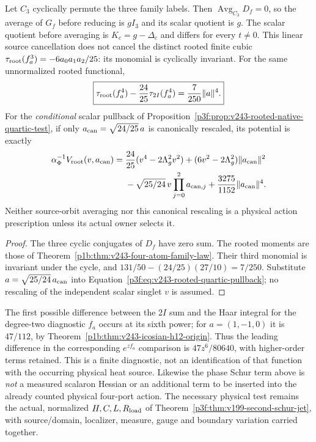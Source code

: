 \documentclass[11pt,a4paper]{article}
\begin{document}
\begin{corollary}
\label{p3g:cor:v244-cyclic-quotient-order}
Let \(C_3\) cyclically permute the three family labels.  Then
\(\operatorname{Avg}_{C_3}D_f=0\), so the average of \(G_f\)
before reducing is \(gI_3\) and its scalar quotient is \(g\).
The scalar quotient before averaging is \(K_c=g-\Delta_c\)
and differs for every \(t\ne0\).  This linear source cancellation
does not cancel the distinct rooted finite cubic
\(\tau_{\rm root}(f_a^3)=-6a_0a_1a_2/25\): its monomial is
cyclically invariant.  For the same unnormalized rooted functional,
\[
 \boxed{\tau_{\rm root}(f_a^4)
 -\frac{24}{25}\tau_{2I}(f_a^4)
 =\frac7{250}\|a\|^4.}
\]
For the \emph{conditional} scalar pullback of
Proposition~\ref{p3f:prop:v243-rooted-native-quartic-test}, if only
\(a_{\rm can}=\sqrt{24/25}\,a\) is canonically rescaled, its
potential is exactly
\[
\begin{aligned}
\alpha_\Phi^{-1}V_{\rm root}(v,a_{\rm can})={}&
\frac{24}{25}(v^4-2\Lambda_g^2v^2)
 +(6v^2-2\Lambda_g^2)\|a_{\rm can}\|^2\\
&-\sqrt{25/24}\,v\prod_{j=0}^2a_{{\rm can},j}
 +\frac{3275}{1152}\|a_{\rm can}\|^4.
\end{aligned}
\]
Neither source-orbit averaging nor this canonical rescaling is a
physical action prescription unless its actual owner selects it.
\end{corollary}
\begin{proof}
The three cyclic conjugates of \(D_f\) have zero sum.
The rooted moments are those of
Theorem~\ref{p1b:thm:v243-four-atom-family-law}.  Their third
monomial is invariant under the cycle, and
\(131/50-(24/25)(27/10)=7/250\).
Substitute \(a=\sqrt{25/24}\,a_{\rm can}\) into
Equation~\eqref{p3f:eq:v243-rooted-quartic-pullback}; no rescaling
of the independent scalar singlet \(v\) is assumed.
\end{proof}

\begin{remark}
The first possible difference between the \(2I\) sum and the
Haar integral for the degree-two diagnostic \(f_a\) occurs at its
sixth power; for \(a=(1,-1,0)\) it is \(47/112\), by
Theorem~\ref{p1b:thm:v243-icosian-h12-origin}.  Thus the leading
difference in the corresponding \(e^{zf_a}\) comparison is
\(47z^6/80640\), with higher-order terms retained.
This is a finite diagnostic, not an identification of that function
with the occurring physical heat source.  Likewise the phase Schur
term above is \emph{not} a measured scalaron Hessian or an additional
term to be inserted into the already counted physical four-port action.
The necessary physical test remains the actual, normalized
\(H,C,L,R_{\rm load}\) of
Theorem~\ref{p3f:thm:v199-second-schur-jet}, with source/domain,
localizer, measure, gauge and boundary variation carried together.
\end{remark}
\end{document}
